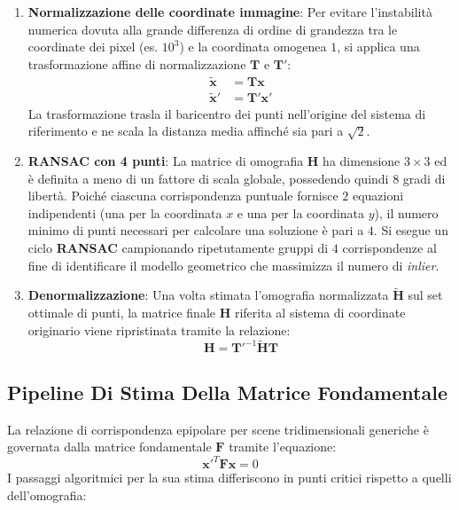 ﻿\documentclass[11pt, a4paper]{article}
\begin{document}
\begin{enumerate}
    \item \textbf{Normalizzazione delle coordinate immagine}: Per evitare l'instabilità numerica dovuta alla grande differenza di ordine di grandezza tra le coordinate dei pixel (es. $10^3$) e la coordinata omogenea $1$, si applica una trasformazione affine di normalizzazione $\bm{T}$ e $\bm{T}'$:
    \begin{align*}
        \tilde{\bm{x}} &= \bm{T}\bm{x} \\
        \tilde{\bm{x}}' &= \bm{T}'\bm{x}'
    \end{align*}
    La trasformazione trasla il baricentro dei punti nell'origine del sistema di riferimento e ne scala la distanza media affinché sia pari a $\sqrt{2}$.

    \item \textbf{RANSAC con 4 punti}: La matrice di omografia $\bm{H}$ ha dimensione $3 \times 3$ ed è definita a meno di un fattore di scala globale, possedendo quindi $8$ gradi di libertà. Poiché ciascuna corrispondenza puntuale fornisce $2$ equazioni indipendenti (una per la coordinata $x$ e una per la coordinata $y$), il numero minimo di punti necessari per calcolare una soluzione è pari a $4$. Si esegue un ciclo \textbf{RANSAC} campionando ripetutamente gruppi di $4$ corrispondenze al fine di identificare il modello geometrico che massimizza il numero di \emph{inlier}.

    \item \textbf{Denormalizzazione}: Una volta stimata l'omografia normalizzata $\tilde{\bm{H}}$ sul set ottimale di punti, la matrice finale $\bm{H}$ riferita al sistema di coordinate originario viene ripristinata tramite la relazione:
    \[ \boxed{\bm{H} = \bm{T}'^{-1}\tilde{\bm{H}}\bm{T}} \]
\end{enumerate}

\subsection{Pipeline Di Stima Della Matrice Fondamentale}

La relazione di corrispondenza epipolare per scene tridimensionali generiche è governata dalla matrice fondamentale $\bm{F}$ tramite l'equazione:
\[ \bm{x}'^T \bm{F}\bm{x} = 0 \]
I passaggi algoritmici per la sua stima differiscono in punti critici rispetto a quelli dell'omografia:
\end{document}
